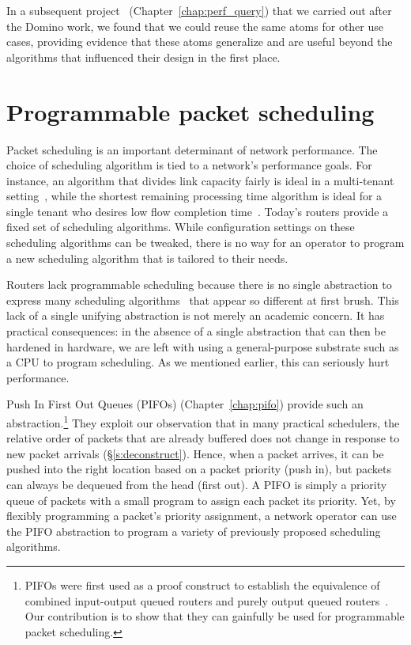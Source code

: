 In a subsequent project~\cite{perf_query} (Chapter~\ref{chap:perf_query}) that
we carried out after the Domino work, we found that we could reuse the same
atoms for other use cases, providing evidence that these atoms generalize and
are useful beyond the algorithms that influenced their design in the first
place.

\section{Programmable packet scheduling}
Packet scheduling is an important determinant of network performance. The
choice of scheduling algorithm is tied to a network's performance goals. For
instance, an algorithm that divides link capacity fairly is ideal in a
multi-tenant setting~\cite{wfq}, while the shortest remaining processing time
algorithm is ideal for a single tenant who desires low flow completion
time~\cite{pFabric}. Today's routers provide a fixed set of scheduling
algorithms. While configuration settings on these scheduling algorithms can be
tweaked, there is no way for an operator to program a new scheduling algorithm
that is tailored to their needs.

Routers lack programmable scheduling because there is no single abstraction to
express many scheduling algorithms~\cite{wfq, srpt, srr, pFabric, lstf} that
appear so different at first brush. This lack of a single unifying abstraction
is not merely an academic concern. It has practical consequences: in the
absence of a single abstraction that can then be hardened in hardware, we are
left with using a general-purpose substrate such as a CPU to program
scheduling. As we mentioned earlier, this can seriously hurt performance.

 Push In First Out Queues (PIFOs) (Chapter~\ref{chap:pifo}) provide such an
abstraction.\footnote{PIFOs were first used as a proof construct to establish
the equivalence of combined input-output queued routers and purely output
queued routers~\cite{pifo}. Our contribution is to show that they can gainfully
be used for programmable packet scheduling.} They exploit our observation that
in many practical schedulers, the relative order of packets that are already
buffered does not change in response to new packet arrivals
(\S\ref{s:deconstruct}). Hence, when a packet arrives, it can be pushed into
the right location based on a packet priority (push in), but packets can always
be dequeued from the head (first out). A PIFO is simply a
priority queue of packets with a small program to assign each packet its
priority. Yet, by flexibly programming a packet's priority assignment, a
network operator can use the PIFO abstraction to program a variety of
previously proposed scheduling algorithms. 

